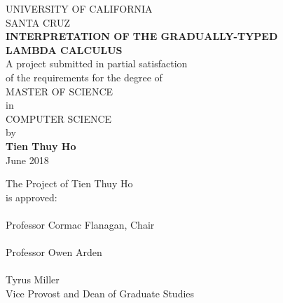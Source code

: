 \thispagestyle{empty}

\pagebreak
\begin{center}
  UNIVERSITY OF CALIFORNIA \\
  SANTA CRUZ \\
  \bigskip
  \textbf{INTERPRETATION OF THE GRADUALLY-TYPED} \\
  \textbf{LAMBDA CALCULUS} \\ 
  \bigskip
  A project submitted in partial satisfaction \\ 
  of the requirements for the degree of \\ 
  \bigskip
  MASTER OF SCIENCE \\ 
  \bigskip
  in \\
  \bigskip
  COMPUTER SCIENCE \\
  \bigskip 
  by \\ 
  \bigskip
  \textbf{Tien Thuy Ho} \\
  \bigskip
  June 2018
  \bigskip
  \bigskip
\end{center}
\begin{flushleft}
  \hspace{7cm}The Project of Tien Thuy Ho \\
  \hspace{7cm}is approved: \\
  \bigskip
  \bigskip
  \hspace{7cm} \hrulefill \\
  \hspace{7cm} Professor Cormac Flanagan, Chair \\ 
  \bigskip
  \bigskip
  \hspace{7cm} \hrulefill \\
  \hspace{7cm} Professor Owen Arden \\
  \bigskip
  \bigskip 
  \underline{\hspace{6cm}} \\ 
  Tyrus Miller \\
  Vice Provost and Dean of Graduate Studies
\end{flushleft}
\pagebreak